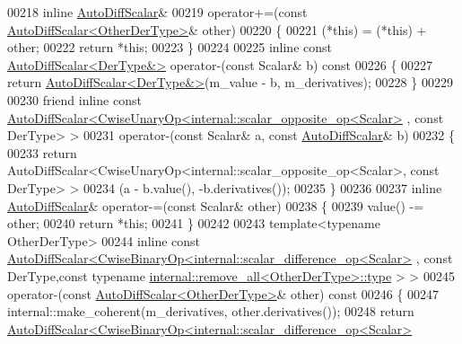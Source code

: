 \begin{DoxyCode}
00218     \textcolor{keyword}{inline} \hyperlink{class_eigen_1_1_auto_diff_scalar}{AutoDiffScalar}&
00219     operator+=(\textcolor{keyword}{const} \hyperlink{class_eigen_1_1_auto_diff_scalar}{AutoDiffScalar<OtherDerType>}& other)
00220     \{
00221       (*this) = (*this) + other;
00222       \textcolor{keywordflow}{return} *\textcolor{keyword}{this};
00223     \}
00224 
00225     \textcolor{keyword}{inline} \textcolor{keyword}{const} \hyperlink{class_eigen_1_1_auto_diff_scalar}{AutoDiffScalar<DerType&>} operator-(\textcolor{keyword}{const} Scalar& b)\textcolor{keyword}{ const}
00226 \textcolor{keyword}{    }\{
00227       \textcolor{keywordflow}{return} \hyperlink{class_eigen_1_1_auto_diff_scalar}{AutoDiffScalar<DerType&>}(m\_value - b, m\_derivatives);
00228     \}
00229 
00230     \textcolor{keyword}{friend} \textcolor{keyword}{inline} \textcolor{keyword}{const} 
      \hyperlink{class_eigen_1_1_auto_diff_scalar}{AutoDiffScalar<CwiseUnaryOp<internal::scalar\_opposite\_op<Scalar>}
      , \textcolor{keyword}{const} DerType> >
00231     operator-(\textcolor{keyword}{const} Scalar& a, \textcolor{keyword}{const} \hyperlink{class_eigen_1_1_auto_diff_scalar}{AutoDiffScalar}& b)
00232     \{
00233       \textcolor{keywordflow}{return} AutoDiffScalar<CwiseUnaryOp<internal::scalar\_opposite\_op<Scalar>, \textcolor{keyword}{const} DerType> >
00234             (a - b.value(), -b.derivatives());
00235     \}
00236 
00237     \textcolor{keyword}{inline} \hyperlink{class_eigen_1_1_auto_diff_scalar}{AutoDiffScalar}& operator-=(\textcolor{keyword}{const} Scalar& other)
00238     \{
00239       value() -= other;
00240       \textcolor{keywordflow}{return} *\textcolor{keyword}{this};
00241     \}
00242 
00243     \textcolor{keyword}{template}<\textcolor{keyword}{typename} OtherDerType>
00244     \textcolor{keyword}{inline} \textcolor{keyword}{const} 
      \hyperlink{class_eigen_1_1_auto_diff_scalar}{AutoDiffScalar<CwiseBinaryOp<internal::scalar\_difference\_op<Scalar>}
      , \textcolor{keyword}{const} DerType,\textcolor{keyword}{const} \textcolor{keyword}{typename} \hyperlink{group___sparse_core___module}{internal::remove\_all<OtherDerType>::type}
      > >
00245     operator-(\textcolor{keyword}{const} \hyperlink{class_eigen_1_1_auto_diff_scalar}{AutoDiffScalar<OtherDerType>}& other)\textcolor{keyword}{ const}
00246 \textcolor{keyword}{    }\{
00247       internal::make\_coherent(m\_derivatives, other.derivatives());
00248       \textcolor{keywordflow}{return} \hyperlink{class_eigen_1_1_auto_diff_scalar}{AutoDiffScalar<CwiseBinaryOp<internal::scalar\_difference\_op<Scalar>}

\end{DoxyCode}
